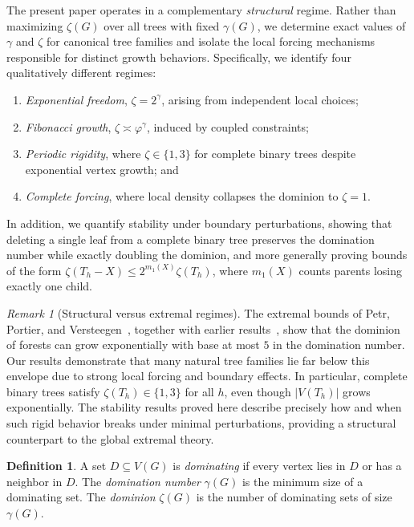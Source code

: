 \documentclass[11pt]{article}
\theoremstyle{definition}
\newtheorem{definition}[theorem]{Definition}
\theoremstyle{remark}
\newtheorem{remark}[theorem]{Remark}
\newcommand{\gam}{\gamma}
\newcommand{\zet}{\zeta}
\begin{document}
The present paper operates in a complementary \emph{structural} regime. Rather than maximizing $\zet(G)$
over all trees with fixed $\gam(G)$, we determine exact values of $\gam$ and $\zet$ for canonical tree
families and isolate the local forcing mechanisms responsible for distinct growth behaviors.
Specifically, we identify four qualitatively different regimes:
\begin{enumerate}[label=(\roman*),leftmargin=*]
\item \emph{Exponential freedom}, $\zet=2^{\gam}$, arising from independent local choices;
\item \emph{Fibonacci growth}, $\zet\asymp \varphi^{\gam}$, induced by coupled constraints;
\item \emph{Periodic rigidity}, where $\zet\in\{1,3\}$ for complete binary trees despite exponential
vertex growth; and
\item \emph{Complete forcing}, where local density collapses the dominion to $\zet=1$.
\end{enumerate}
In addition, we quantify stability under boundary perturbations, showing that deleting a single leaf
from a complete binary tree preserves the domination number while exactly doubling the dominion, and
more generally proving bounds of the form
$\zet(T_h-X)\le 2^{m_1(X)}\zet(T_h)$, where $m_1(X)$ counts parents losing exactly one child.

\begin{remark}[Structural versus extremal regimes]
The extremal bounds of Petr, Portier, and Versteegen~\cite{PetrPortierVersteegen2024}, together with earlier
results~\cite{GodboleJamiesonJamieson2014,ConnollyGaborGodboleKay2016}, show that the dominion of forests
can grow exponentially with base at most $5$ in the domination number. Our results demonstrate that many
natural tree families lie far below this envelope due to strong local forcing and boundary effects.
In particular, complete binary trees satisfy $\zet(T_h)\in\{1,3\}$ for all $h$, even though $|V(T_h)|$
grows exponentially. The stability results proved here describe precisely how and when such rigid behavior
breaks under minimal perturbations, providing a structural counterpart to the global extremal theory.
\end{remark}

\begin{definition}
A set $D\subseteq V(G)$ is \emph{dominating} if every vertex lies in $D$ or has a neighbor in $D$.
The \emph{domination number} $\gam(G)$ is the minimum size of a dominating set.
The \emph{dominion} $\zet(G)$ is the number of dominating sets of size $\gam(G)$.
\end{definition}
\end{document}
